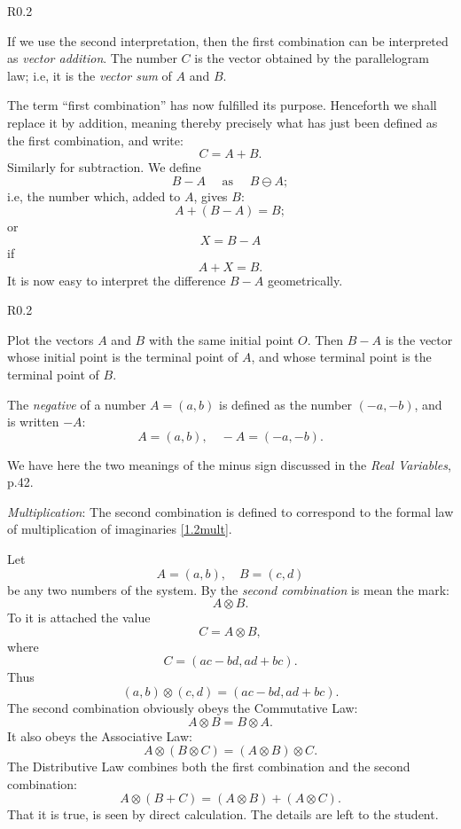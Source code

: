 \documentclass[letter,oneside]{memoir}
\begin{document}
\begin{wrapfigure}{R}{0.2\textwidth}
	\centering
{}
\end{wrapfigure} 


If we use the second interpretation, then the first combination can be interpreted as \emph{vector addition}. The number $C$ is the vector obtained by the parallelogram law; i.e, it is the \emph{vector sum} of $A$ and $B$. 

The term ``first combination'' has now fulfilled its purpose. Henceforth we shall replace it by addition, meaning thereby precisely what has just been defined as the first combination, and write:
\[
C=A+B
.\] Similarly for subtraction. We define
\[
B-A \quad \text{ as } \quad B \ominus A;
\] i.e, the number which, added to $A$, gives $B$:
\[
	A+(B-A)=B
;\] or
\[
X=B-A
\]if
\[
A+X=B
.\] It is now easy to interpret the difference $B-A$ geometrically. 
\begin{wrapfigure}{R}{0.2\textwidth}
	\centering
{}
\end{wrapfigure} 

Plot the vectors $A$ and $B$ with the same initial point $O$. Then $B-A$ is the vector whose initial point is the terminal point of $A$, and whose terminal point is the terminal point of $B$. 

The \emph{negative} of a number $A=(a,b)$ is defined as the number $(-a,-b)$, and is written $-A$:
\[
	A=(a,b), \quad -A=(-a,-b)
.\] 

We have here the two meanings of the minus sign discussed in the \emph{Real Variables}, p.42.

\emph{Multiplication}: The second combination is defined to correspond to the formal law of multiplication of imaginaries \ref{1.2mult}.

Let
\[
	A=(a,b), \quad B=(c,d)
\] be any two numbers of the system. By the \emph{second combination} is mean the mark:
\[
A\otimes B
.\] To it is attached the value
\[
C=A \otimes B
,\] where
\[
	C=(ac-bd,ad+bc)
.\] Thus
\[
	(a,b) \otimes (c,d) = (ac-bd,ad+bc)
.\] The second combination obviously obeys the Commutative Law:
\[
A\otimes B = B \otimes A
.\] It also obeys the Associative Law:
\[
	A\otimes (B \otimes C)=(A\otimes B)\otimes C
.\] The Distributive Law combines both the first combination and the second combination:
\[
	A\otimes (B+C)=(A\otimes B)+(A\otimes C)
.\] That it is true, is seen by direct calculation. The details are left to the student.
\end{document}
